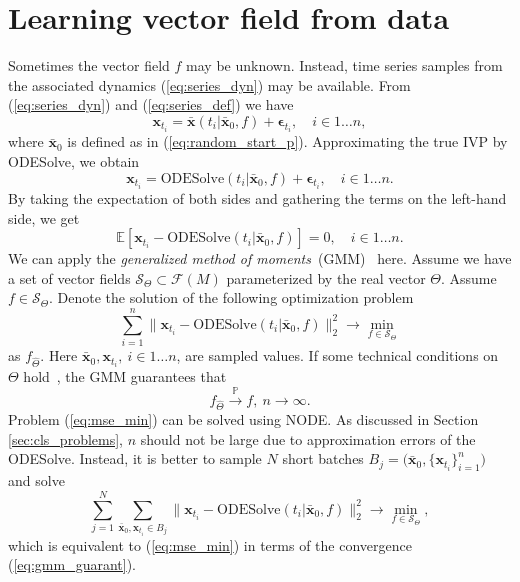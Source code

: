 \documentclass[referee, pdflatex, sn-mathphys-num]{sn-jnl}
\theoremstyle{definition}
\theoremstyle{plain}
\newcommand{\bx}{\ensuremath{\mathbf{x}}}
\newcommand{\bbx}{\ensuremath{\bar{\mathbf{x}}}}
\newcommand{\beps}{\ensuremath{\boldsymbol{\epsilon}}}
\begin{document}
	\section{Learning vector field from data}\label{sec:learn_ode}
	
	Sometimes the vector field $f$ may be unknown. Instead, time series samples from the associated dynamics (\ref{eq:series_dyn}) may be available. From (\ref{eq:series_dyn}) and (\ref{eq:series_def}) we have
	\begin{equation*}
		\bx_{t_i} = \bbx(t_i | \bbx_0, f) + \beps_{t_i}, \quad i \in 1 \ldots n,
	\end{equation*}
	where $\bbx_0$ is defined as in (\ref{eq:random_start_p}). Approximating the true IVP by ODESolve, we obtain
	\begin{equation*}
		\bx_{t_i} =  \text{ODESolve}(t_i | \bbx_0, f) + \beps_{t_i}, \quad i \in 1 \ldots n.
	\end{equation*}
	By taking the expectation of both sides and gathering the terms on the left-hand side, we get
	\begin{equation*}
		\mathbb{E} \left[ \bx_{t_i} -  \text{ODESolve}(t_i | \bbx_0, f) \right]  = 0, \quad i \in 1 \ldots n.
	\end{equation*}
	We can apply the \emph{generalized method of moments}~(GMM)~\cite{gmm_hansen} here. Assume we have a set of vector fields $\mathcal{S}_{\Theta} \subset \mathcal{F}(M)$ parameterized by the real vector $\Theta$. Assume $f \in \mathcal{S}_{\Theta}$. Denote the solution of the following optimization problem
	\begin{equation}\label{eq:mse_min}
		\sum\limits_{i=1}^n \big\lVert  \bx_{t_i} -  \text{ODESolve}(t_i | \bbx_0, f) \big\rVert_2^2 \to \underset{f \in \mathcal{S}_{\Theta}}{\min}
	\end{equation}
	as $f_{\hat{\Theta}}$. Here $\bbx_0, \bx_{t_i}, \ i \in 1 \ldots n$, are sampled values. If some technical conditions on $\Theta$ hold~\cite{gmm_hansen}, the GMM guarantees that
	\begin{equation}\label{eq:gmm_guarant}
		f_{\hat{\Theta}} \xrightarrow{\mathbb{P}} f, \ n \to \infty.
	\end{equation}
	Problem (\ref{eq:mse_min}) can be solved using NODE. As discussed in Section \ref{sec:cls_problems}, $n$ should not be large due to approximation errors of the ODESolve. Instead, it is better to sample $N$ short batches $ B_j = \big( \bbx_0, \{\bx_{t_i} \}_{i=1}^n \big)$ and solve
	\begin{equation}\label{eq:mse_min_batch}
		\sum\limits_{j=1}^N \sum\limits_{\bbx_0, \bx_{t_i} \in B_j} \big\lVert  \bx_{t_i} -  \text{ODESolve}(t_i | \bbx_0, f) \big\rVert_2^2 \to \underset{f \in \mathcal{S}_{\Theta}}{\min},
	\end{equation}
	which is equivalent to (\ref{eq:mse_min}) in terms of the convergence (\ref{eq:gmm_guarant}).
	
\end{document}
